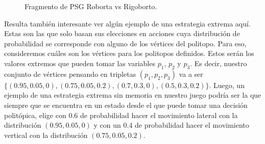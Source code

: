 \begin{figure}[ht]
	\caption{Fragmento de PSG Roborta vs Rigoborto.}
	\label{fig:psg}
\end{figure}

Resulta también interesante ver algún ejemplo de una estrategia extrema aquí.
Estas son las que solo basan sus elecciones en acciones cuya distribución de
probabilidad se corresponde con alguno de los vértices del politopo. Para eso,
consideremos cuáles son los vértices para los politopos definidos. Estos serán
los valores extremos que pueden tomar las variables $p_1$, $p_2$ y $p_3$. Es
decir, nuestro conjunto de vértices pensando en tripletas $(p_1, p_2, p_3)$ va
a ser $\{(0.95, 0.05, 0), (0.75, 0.05, 0.2), (0.7, 0.3, 0), (0.5, 0.3, 0.2)\}$.
Luego, un ejemplo de una estrategia extrema sin memoria en nuestro juego podría
ser la que siempre que se encuentra en un estado desde el que puede tomar una
decisión politópica, elige con $0.6$ de probabilidad hacer el movimiento
lateral con la distribución $(0.95, 0.05, 0)$ y con un $0.4$ de probabilidad
hacer el movimiento vertical con la distribución $(0.75, 0.05, 0.2)$.

